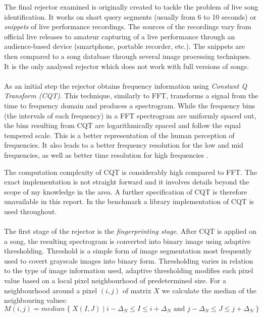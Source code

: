 The final rejector examined is originally created to tackle the problem of live
song identification. It works on short query segments (usually from 6 to 10
seconds) or \textit{snippets} of live performance recordings. The sources of the
recordings vary from official live releases to amateur capturing of a live
performance through an audience-based device (smartphone, portable recorder,
etc.). The snippets are then compared to a song database through several image
processing techniques. It is the only analysed rejector which does not work with
full versions of songs.

\paragraph{}
As an initial step the rejector obtains frequency information using
\textit{Constant Q Transform (CQT)}. This technique, similarly to FFT,
transforms a signal from the time to frequency domain and produces a
spectrogram. While the frequency bins (the intervals of each frequency) in a FFT
spectrogram are uniformly spaced out, the bins resulting from CQT are
logarithmically spaced and follow the equal tempered scale. This is a better
representation of the human perception of frequencies. It also leads to a better
frequency resolution for the low and mid frequencies, as well as better time
resolution for high frequencies \cite{schorkhuber2010constant}.

The computation complexity of CQT is considerably high compared to FFT. The
exact implementation is not straight forward and it involves details beyond the
scope of my knowledge in the area. A further specification of CQT is therefore
unavailable in this report. In the benchmark a library implementation of CQT is
used throughout.

\paragraph{}
The first stage of the rejector is the \textit{fingerprinting stage}. After CQT
is applied on a song, the resulting spectrogram is converted into binary image
using adaptive thresholding. Threshold is a simple form of image segmentation
most frequently used to covert grayscale images into binary form. Thresholding
varies in relation to the type of image information used, adaptive thresholding
modifies each pixel value based on a local pixel neighbourhood of predetermined
size. For a neighbourhood around a pixel $(i, j)$ of matrix $X$ we calculate the
median of the neighbouring values:
\begin{equation}
   M(i, j) = median\; \{\; X(I, J) \mid i-\Delta_N \leq I \leq i+\Delta_N \text{ and } j-\Delta_N \leq J \leq j+\Delta_N \; \}
\end{equation}

